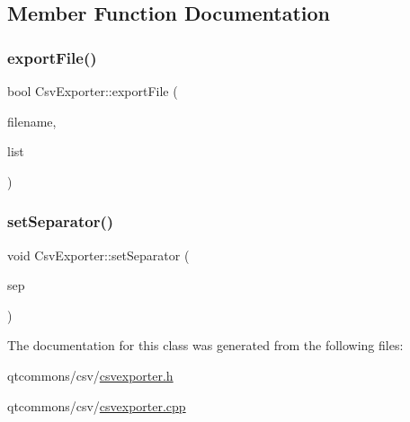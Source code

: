 \subsection{Member Function Documentation}
\mbox{\label{class_csv_exporter_ae561d65e331f93d250ba61d79b83fa42}} 
\subsubsection{\texorpdfstring{exportFile()}{exportFile()}}
{\footnotesize\ttfamily bool Csv\+Exporter\+::export\+File (\begin{DoxyParamCaption}\item[{Q\+String}]{filename,  }\item[{const Q\+List$<$ Q\+String\+List $>$ \&}]{list }\end{DoxyParamCaption})}

\mbox{\label{class_csv_exporter_a7334513ed99bcb6457806faab7ae6eec}} 
\subsubsection{\texorpdfstring{setSeparator()}{setSeparator()}}
{\footnotesize\ttfamily void Csv\+Exporter\+::set\+Separator (\begin{DoxyParamCaption}\item[{Q\+Char}]{sep }\end{DoxyParamCaption})\hspace{0.3cm}{\ttfamily [inline]}}



The documentation for this class was generated from the following files\+:\begin{DoxyCompactItemize}
\item 
qtcommons/csv/\mbox{\hyperlink{csvexporter_8h}{csvexporter.\+h}}\item 
qtcommons/csv/\mbox{\hyperlink{csvexporter_8cpp}{csvexporter.\+cpp}}\end{DoxyCompactItemize}
